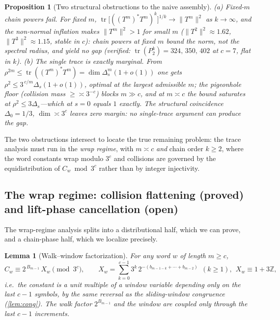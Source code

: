 \documentclass[11pt]{article}
\newcommand{\Z}{\mathbb{Z}}
\theoremstyle{plain}
\newtheorem{proposition}{Proposition}
\newtheorem{lemma}{Lemma}
\theoremstyle{definition}
\theoremstyle{remark}
\begin{document}
\begin{proposition}[Two structural obstructions to the naive assembly]
\label{prop:marginal}
\emph{(a) Fixed-$m$ chain powers fail.} For fixed $m$,
$\operatorname{tr}\bigl[((T^m)^*T^m)^k\bigr]^{1/k}\to\lVert T^m\rVert^2$ as
$k\to\infty$, and the non-normal inflation makes $\lVert T^m\rVert^2>1$ for
small $m$ ($\lVert T^2\rVert^2\approx1.62$, $\lVert T^3\rVert^2\approx1.15$,
stable in $c$): chain powers at fixed $m$ bound the \emph{norm}, not the
spectral radius, and yield no gap (verified:
$\operatorname{tr}(P_2^k)=324,\,350,\,402$ at $c=7$, flat in $k$).
\emph{(b) The single trace is exactly marginal.} From
$\rho^{2m}\le\operatorname{tr}((T^m)^*T^m)=\dim\Delta_s^m(1+o(1))$ one gets
$\rho^2\le3^{\,c/m}\Delta_s(1+o(1))$, optimal at the largest admissible $m$;
the pigeonhole floor (collision mass $\ge\asymp3^{-c}$) blocks $m\gg c$, and at
$m\asymp c$ the bound saturates at $\rho^2\le3\Delta_s$---which at $s=0$ equals
$1$ \emph{exactly}. The structural coincidence $\Delta_0=1/3$,
$\dim\asymp3^c$ leaves zero margin: no single-trace argument can produce the
gap.
\end{proposition}

\noindent The two obstructions intersect to locate the true remaining problem:
the trace analysis must run in the \emph{wrap regime}, with $m\asymp c$
\emph{and} chain order $k\ge2$, where the word constants wrap modulo $3^c$ and
collisions are governed by the equidistribution of $C_w\bmod3^c$ rather than by
integer injectivity.

\subsection*{The wrap regime: collision flattening (proved) and lift-phase
cancellation (open)}

The wrap-regime analysis splits into a distributional half, which we can prove,
and a chain-phase half, which we localize precisely.

\begin{lemma}[Walk--window factorization]\label{lem:walkwindow}
For any word $w$ of length $m\ge c$,
\[
C_w\equiv2^{\,B_{m-1}}\,X_w\pmod{3^c},
\qquad
X_w=\sum_{k=0}^{c-1}3^{k}\,2^{-(b_{m-1-k}+\cdots+b_{m-2})}\ \ (k\ge1),\ \
X_w\equiv1+3\Z ,
\]
i.e.\ the constant is a unit multiple of a \emph{window variable} depending
only on the last $c-1$ symbols, by the same reversal as the sliding-window
congruence (\cref{lem:cong}). The walk factor $2^{B_{m-1}}$ and the window are
coupled only through the last $c-1$ increments.
\end{lemma}
\end{document}
